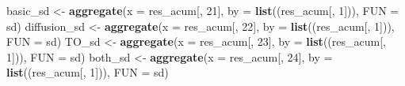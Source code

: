 \documentclass[]{book}
\newenvironment{Shaded}{\begin{snugshade}}{\end{snugshade}}
\newcommand{\KeywordTok}[1]{\textcolor[rgb]{0.13,0.29,0.53}{\textbf{{#1}}}}
\newcommand{\DataTypeTok}[1]{\textcolor[rgb]{0.13,0.29,0.53}{{#1}}}
\newcommand{\DecValTok}[1]{\textcolor[rgb]{0.00,0.00,0.81}{{#1}}}
\newcommand{\StringTok}[1]{\textcolor[rgb]{0.31,0.60,0.02}{{#1}}}
\newcommand{\NormalTok}[1]{{#1}}
\theoremstyle{definition}
\theoremstyle{definition}
\theoremstyle{definition}
\theoremstyle{remark}
\begin{document}
\begin{Shaded}
\begin{Highlighting}[]
\NormalTok{basic_sd <-}\StringTok{ }\KeywordTok{aggregate}\NormalTok{(}\DataTypeTok{x =}\NormalTok{ res_acum[, }\DecValTok{21}\NormalTok{], }\DataTypeTok{by =} \KeywordTok{list}\NormalTok{((res_acum[, }\DecValTok{1}\NormalTok{])), }\DataTypeTok{FUN =}\NormalTok{ sd)}
\NormalTok{diffusion_sd <-}\StringTok{ }\KeywordTok{aggregate}\NormalTok{(}\DataTypeTok{x =}\NormalTok{ res_acum[, }\DecValTok{22}\NormalTok{], }\DataTypeTok{by =} \KeywordTok{list}\NormalTok{((res_acum[, }\DecValTok{1}\NormalTok{])), }\DataTypeTok{FUN =}\NormalTok{ sd)}
\NormalTok{TO_sd <-}\StringTok{ }\KeywordTok{aggregate}\NormalTok{(}\DataTypeTok{x =}\NormalTok{ res_acum[, }\DecValTok{23}\NormalTok{], }\DataTypeTok{by =} \KeywordTok{list}\NormalTok{((res_acum[, }\DecValTok{1}\NormalTok{])), }\DataTypeTok{FUN =}\NormalTok{ sd)}
\NormalTok{both_sd <-}\StringTok{ }\KeywordTok{aggregate}\NormalTok{(}\DataTypeTok{x =}\NormalTok{ res_acum[, }\DecValTok{24}\NormalTok{], }\DataTypeTok{by =} \KeywordTok{list}\NormalTok{((res_acum[, }\DecValTok{1}\NormalTok{])), }\DataTypeTok{FUN =}\NormalTok{ sd)}



\end{Highlighting}
\end{Shaded}
\end{document}

